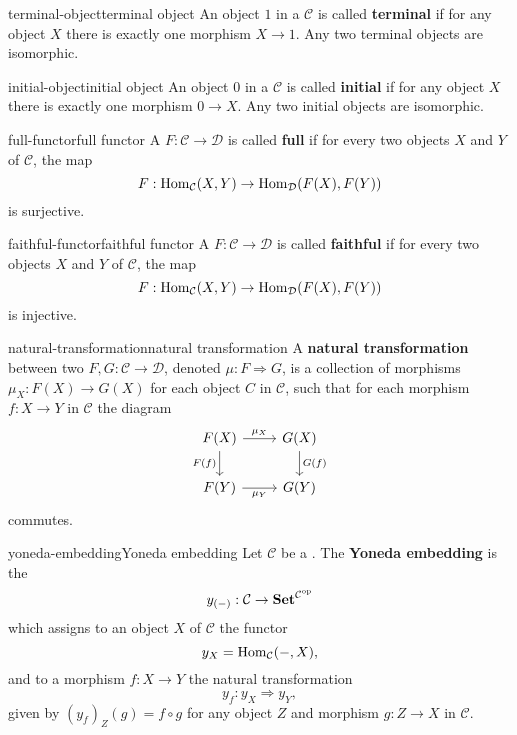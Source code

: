 \begin{topic}{terminal-object}{terminal object}
    An object $1$ in a  $\mathcal{C}$ is called \textbf{terminal} if for any object $X$ there is exactly one morphism $X \to 1$. Any two terminal objects are isomorphic.
\end{topic}

\begin{topic}{initial-object}{initial object}
    An object $0$ in a  $\mathcal{C}$ is called \textbf{initial} if for any object $X$ there is exactly one morphism $0 \to X$. Any two initial objects are isomorphic.
\end{topic}

\begin{topic}{full-functor}{full functor}
    A  $F : \mathcal{C} \to \mathcal{D}$ is called \textbf{full} if for every two objects $X$ and $Y$ of $\mathcal{C}$, the map
    \[ F : \operatorname{Hom}_{\mathcal{C}}(X, Y) \to \operatorname{Hom}_{\mathcal{D}}(F(X), F(Y)) \]
    is surjective.
\end{topic}

\begin{topic}{faithful-functor}{faithful functor}
    A  $F : \mathcal{C} \to \mathcal{D}$ is called \textbf{faithful} if for every two objects $X$ and $Y$ of $\mathcal{C}$, the map
    \[ F : \operatorname{Hom}_{\mathcal{C}}(X, Y) \to \operatorname{Hom}_{\mathcal{D}}(F(X), F(Y)) \]
    is injective.
\end{topic}

\begin{topic}{natural-transformation}{natural transformation}
    A \textbf{natural transformation} between two  $F, G : \mathcal{C} \to \mathcal{D}$, denoted $\mu : F \Rightarrow G$, is a collection of morphisms $\mu_X : F(X) \to G(X)$ for each object $C$ in $\mathcal{C}$, such that for each morphism $f : X \to Y$ in $\mathcal{C}$ the diagram
    \[ \begin{tikzcd} F(X) \arrow{r}{\mu_X} \arrow[swap]{d}{F(f)} & G(X) \arrow{d}{G(f)} \\ F(Y) \arrow[swap]{r}{\mu_Y} & G(Y) \end{tikzcd} \]
    commutes. 
\end{topic}

\begin{topic}{yoneda-embedding}{Yoneda embedding}
    Let $\mathcal{C}$ be a . The \textbf{Yoneda embedding} is the 
    \[ y_{(-)} : \mathcal{C} \to \textbf{Set}^{\mathcal{C}^\textup{op}} \]
    which assigns to an object $X$ of $\mathcal{C}$ the functor
    \[ y_X = \operatorname{Hom}_{\mathcal{C}}(-, X) , \]
    and to a morphism $f : X \to Y$ the natural transformation
    \[ y_f : y_X \Rightarrow y_Y , \]
    given by $(y_f)_Z(g) = f \circ g$ for any object $Z$ and morphism $g : Z \to X$ in $\mathcal{C}$.
\end{topic}

